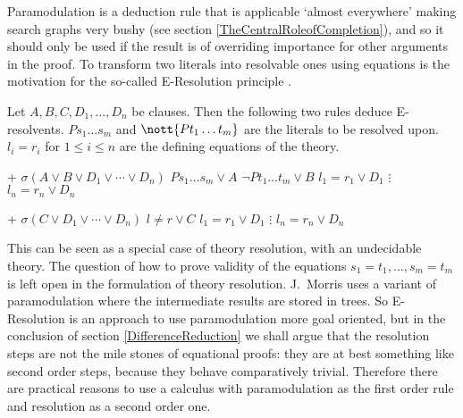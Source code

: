 Paramodulation is a deduction rule that is applicable 
`almost everywhere' making search graphs
very bushy \cite{Bundy83} (see section \ref{TheCentralRoleofCompletion}),
and so it should only be 
used if the result is of overriding importance
for other arguments in the proof.
To transform two literals into resolvable ones using
equations is the motivation for the so-called
E-Resolution principle \cite{Morris69,Anderson70}.
\begin{Def}[E-Resolution]
\return\vspace{-3mm}
\label{EResolution}

Let $A, B, C, D_1,\ldots , D_n$ be clauses. Then the following two rules
deduce E-resolvents.
$Ps_1\ldots s_m$ and $\nott{
Pt_1\ldots t_m}$ are the literals to be resolved upon.
$l_i=r_i$ for $1\leq i\leq n$ are the defining 
equations of the
theory. 
\vspace{2mm}

\hlineblockfive%
{+}%
{$\sigma(A\lor B \lor D_1 \lor \cdots \lor D_n)$}%
{$Ps_1\ldots s_m \lor A$}%
{$\neg Pt_1\ldots t_m \lor B$}%
{$l_1=r_1 \lor D_1$}%
{$\vdots$}%
{$l_n=r_n \lor D_n$}

\vspace{3mm}
\hlineblockfour%
{+}%
{$\sigma(C \lor D_1 \lor \cdots \lor D_n)$}%
{$l\not=r \lor C$}%
{$l_1=r_1 \lor D_1$}%
{$\vdots$}%
{$l_n=r_n \lor D_n$}


\end{Def}

This can be seen as a
special case of theory resolution, with an undecidable theory. The question
of how to prove validity of the equations $s_1=t_1, \ldots ,s_m=t_m$ is 
left open in the formulation of theory resolution. J.\ Morris \cite{Morris69} 
uses a variant of paramodulation where the intermediate results are 
stored in trees. So E-Resolution is an approach to use paramodulation 
more goal oriented, but in the conclusion of section 
\ref{DifferenceReduction} we shall argue that the resolution steps
are not the mile stones of equational proofs: they are at best something
 like second order steps, because they behave comparatively trivial. 
Therefore there are practical reasons to use a calculus with 
paramodulation as the first order rule and resolution as a second order 
one.  \label{DecDisc1}

